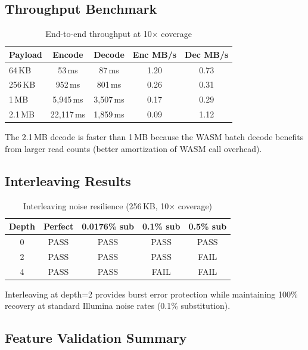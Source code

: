 \documentclass[11pt,a4paper]{article}
\begin{document}
\subsection{Throughput Benchmark}

\begin{table}[h]
\centering
\caption{End-to-end throughput at 10$\times$ coverage}
\begin{tabular}{lcccc}
\toprule
Payload & Encode & Decode & Enc MB/s & Dec MB/s \\
\midrule
64\,KB & 53\,ms & 87\,ms & 1.20 & 0.73 \\
256\,KB & 952\,ms & 801\,ms & 0.26 & 0.31 \\
1\,MB & 5,945\,ms & 3,507\,ms & 0.17 & 0.29 \\
2.1\,MB & 22,117\,ms & 1,859\,ms & 0.09 & 1.12 \\
\bottomrule
\end{tabular}
\end{table}

The 2.1\,MB decode is faster than 1\,MB because the WASM batch decode benefits from larger read counts (better amortization of WASM call overhead).

\subsection{Interleaving Results}

\begin{table}[h]
\centering
\caption{Interleaving noise resilience (256\,KB, 10$\times$ coverage)}
\begin{tabular}{ccccc}
\toprule
Depth & Perfect & 0.0176\% sub & 0.1\% sub & 0.5\% sub \\
\midrule
0 & PASS & PASS & PASS & PASS \\
2 & PASS & PASS & PASS & FAIL \\
4 & PASS & PASS & FAIL & FAIL \\
\bottomrule
\end{tabular}
\end{table}

Interleaving at depth=2 provides burst error protection while maintaining 100\% recovery at standard Illumina noise rates (0.1\% substitution).

\subsection{Feature Validation Summary}
\end{document}
